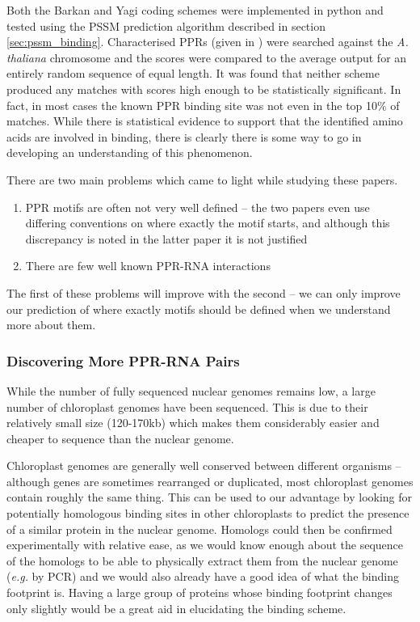 Both the Barkan and Yagi coding schemes were implemented in python and tested
using the PSSM prediction algorithm described in section
\ref{sec:pssm_binding}.
Characterised PPRs (given in \citet{Yagi2013}) were searched against the
\emph{A. thaliana} chromosome and the scores were compared to the average 
output for an entirely random sequence of equal length.
It was found that neither scheme produced any matches with scores high enough 
to be statistically significant.
In fact, in most cases the known PPR binding site was not even in the top 10\%
of matches.
While there is statistical evidence to support that the identified amino acids
are involved in binding, there is clearly there is some way to go in developing 
an understanding of this phenomenon.

There are two main problems which came to light while studying these papers.
\begin{enumerate}
  \item PPR motifs are often not very well defined -- the two papers even use
    differing conventions on where exactly the motif starts, and although this
    discrepancy is noted in the latter paper it is not justified
  \item There are few well known PPR-RNA interactions
\end{enumerate}
The first of these problems will improve with the second -- we can only improve
our prediction of where exactly motifs should be defined when we understand
more about them.

\subsubsection{Discovering More PPR-RNA Pairs}

While the number of fully sequenced nuclear genomes remains low, a large 
number of chloroplast genomes have been sequenced.
This is due to their relatively small size (120-170kb) which makes them
considerably easier and cheaper to sequence than the nuclear genome.

Chloroplast genomes are generally well conserved between different organisms --
although genes are sometimes rearranged or duplicated, most chloroplast genomes
contain roughly the same thing.
This can be used to our advantage by looking for potentially homologous binding
sites in other chloroplasts to predict the presence of a similar protein in 
the nuclear genome.
Homologs could then be confirmed experimentally with relative ease, as we would 
know enough about the sequence of the homologs to be able to physically extract 
them from 
the nuclear genome (\emph{e.g.} by PCR) and we would also already have a good 
idea of what the binding footprint is.
Having a large group of proteins whose binding footprint changes only slightly
would be a great aid in elucidating the binding scheme.

